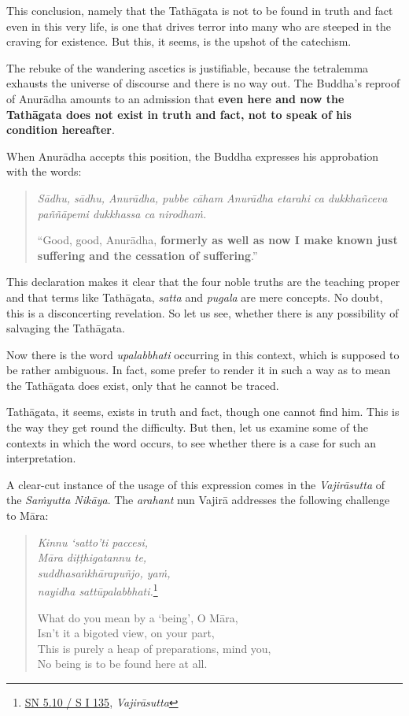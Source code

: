 This conclusion, namely that the Tathāgata is not to be found in truth and fact even in this very life, is one that drives terror into many who are steeped in the craving for existence. But this, it seems, is the upshot of the catechism.

The rebuke of the wandering ascetics is justifiable, because the tetralemma exhausts the universe of discourse and there is no way out. The Buddha's reproof of Anurādha amounts to an admission that \textbf{even here and now the Tathāgata does not exist in truth and fact, not to speak of his condition hereafter}.

When Anurādha accepts this position, the Buddha expresses his approbation with the words:

\begin{quote}
\emph{Sādhu, sādhu, Anurādha, pubbe cāham Anurādha etarahi ca dukkhañceva paññāpemi dukkhassa ca nirodhaṁ.}

``Good, good, Anurādha, \textbf{formerly as well as now I make known just suffering and the cessation of suffering}.''
\end{quote}

This declaration makes it clear that the four noble truths are the teaching proper and that terms like Tathāgata, \emph{satta} and \emph{pugala} are mere concepts. No doubt, this is a disconcerting revelation. So let us see, whether there is any possibility of salvaging the Tathāgata.

Now there is the word \emph{upalabbhati} occurring in this context, which is supposed to be rather ambiguous. In fact, some prefer to render it in such a way as to mean the Tathāgata does exist, only that he cannot be traced.

Tathāgata, it seems, exists in truth and fact, though one cannot find him. This is the way they get round the difficulty. But then, let us examine some of the contexts in which the word occurs, to see whether there is a case for such an interpretation.

A clear-cut instance of the usage of this expression comes in the \emph{Vajirāsutta} of the \emph{Saṁyutta Nikāya}. The \emph{arahant} nun Vajirā addresses the following challenge to Māra:

\clearpage

\begin{quote}
\emph{Kinnu `satto'ti paccesi,}\\
\emph{Māra diṭṭhigatannu te,}\\
\emph{suddhasaṅkhārapuñjo, yaṁ,}\\
\emph{nayidha sattūpalabbhati.}\footnote{\href{https://suttacentral.net/sn5.10/pli/ms}{SN 5.10 / S I 135}, \emph{Vajirāsutta}}

What do you mean by a `being', O Māra,\\
Isn't it a bigoted view, on your part,\\
This is purely a heap of preparations, mind you,\\
No being is to be found here at all.
\end{quote}

